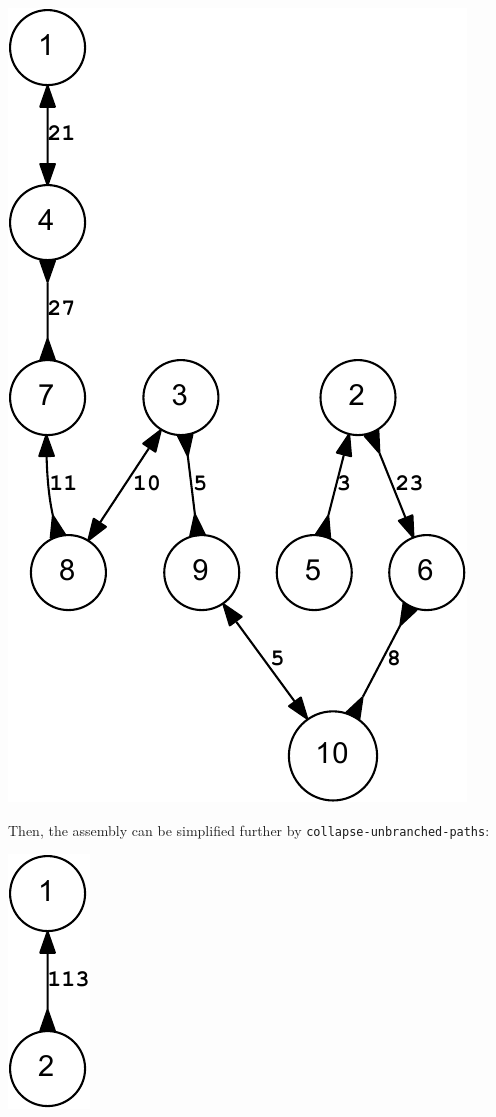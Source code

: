 \documentclass[10pt]{article}
\newcommand{\ProgramName}[1]{{\tt #1}}
\begin{document}
\begin{center}
	\includegraphics[scale=0.8]{example_200bp.reduced.mapped.bidigraph-crop.pdf}	
\end{center}

Then, the assembly can be simplified further by
\ProgramName{collapse-unbranched-paths}:

\begin{center}
	\includegraphics[scale=0.8]{example_200bp.reduced.mapped.collapsed.bidigraph-crop.pdf}	
\end{center}
\end{document}
